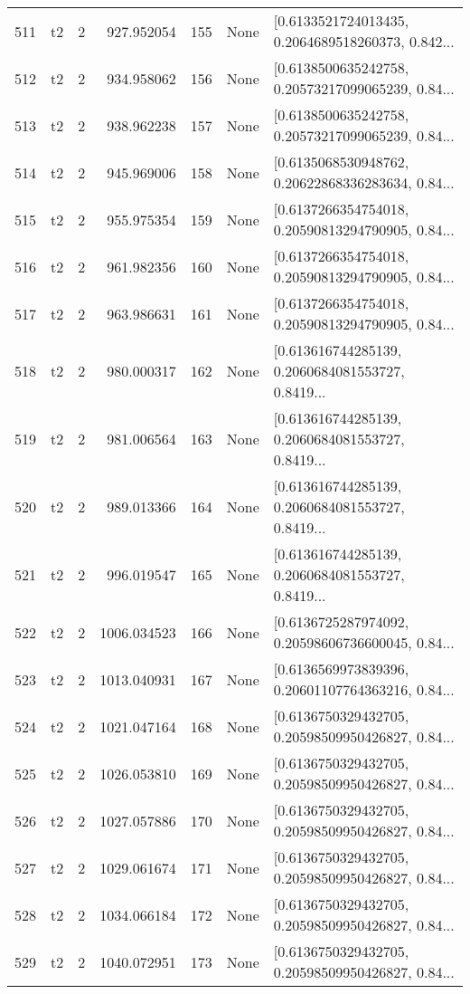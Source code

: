 \begin{tabular}{lllrlll}
511 &  t2 &   2 &   927.952054 &  155 &  None &  [0.6133521724013435, 0.2064689518260373, 0.842... \\
512 &  t2 &   2 &   934.958062 &  156 &  None &  [0.6138500635242758, 0.20573217099065239, 0.84... \\
513 &  t2 &   2 &   938.962238 &  157 &  None &  [0.6138500635242758, 0.20573217099065239, 0.84... \\
514 &  t2 &   2 &   945.969006 &  158 &  None &  [0.6135068530948762, 0.20622868336283634, 0.84... \\
515 &  t2 &   2 &   955.975354 &  159 &  None &  [0.6137266354754018, 0.20590813294790905, 0.84... \\
516 &  t2 &   2 &   961.982356 &  160 &  None &  [0.6137266354754018, 0.20590813294790905, 0.84... \\
517 &  t2 &   2 &   963.986631 &  161 &  None &  [0.6137266354754018, 0.20590813294790905, 0.84... \\
518 &  t2 &   2 &   980.000317 &  162 &  None &  [0.613616744285139, 0.2060684081553727, 0.8419... \\
519 &  t2 &   2 &   981.006564 &  163 &  None &  [0.613616744285139, 0.2060684081553727, 0.8419... \\
520 &  t2 &   2 &   989.013366 &  164 &  None &  [0.613616744285139, 0.2060684081553727, 0.8419... \\
521 &  t2 &   2 &   996.019547 &  165 &  None &  [0.613616744285139, 0.2060684081553727, 0.8419... \\
522 &  t2 &   2 &  1006.034523 &  166 &  None &  [0.6136725287974092, 0.20598606736600045, 0.84... \\
523 &  t2 &   2 &  1013.040931 &  167 &  None &  [0.6136569973839396, 0.20601107764363216, 0.84... \\
524 &  t2 &   2 &  1021.047164 &  168 &  None &  [0.6136750329432705, 0.20598509950426827, 0.84... \\
525 &  t2 &   2 &  1026.053810 &  169 &  None &  [0.6136750329432705, 0.20598509950426827, 0.84... \\
526 &  t2 &   2 &  1027.057886 &  170 &  None &  [0.6136750329432705, 0.20598509950426827, 0.84... \\
527 &  t2 &   2 &  1029.061674 &  171 &  None &  [0.6136750329432705, 0.20598509950426827, 0.84... \\
528 &  t2 &   2 &  1034.066184 &  172 &  None &  [0.6136750329432705, 0.20598509950426827, 0.84... \\
529 &  t2 &   2 &  1040.072951 &  173 &  None &  [0.6136750329432705, 0.20598509950426827, 0.84... \\

\end{tabular}
